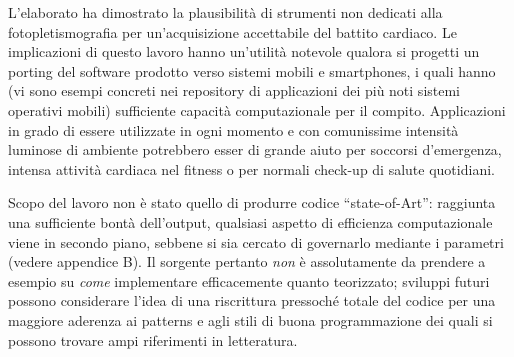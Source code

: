 L'elaborato ha dimostrato la plausibilità di strumenti non dedicati alla fotopletismografia per un'acquisizione accettabile del battito cardiaco. Le implicazioni di questo lavoro hanno un'utilità notevole qualora si progetti un porting del software prodotto verso sistemi mobili e smartphones, i quali hanno (vi sono esempi concreti nei repository di applicazioni dei più noti sistemi operativi mobili) sufficiente capacità computazionale per il compito.
 Applicazioni in grado di essere utilizzate in ogni momento e con comunissime intensità luminose di ambiente potrebbero esser di grande aiuto per soccorsi d'emergenza, intensa attività cardiaca nel fitness o per normali check-up di salute quotidiani.

Scopo del lavoro non è stato quello di produrre codice ``state-of-Art'': raggiunta una sufficiente bontà dell'output, qualsiasi aspetto di efficienza computazionale viene in secondo piano, sebbene si sia cercato di governarlo mediante i parametri (vedere appendice B). Il sorgente pertanto {\em non} è assolutamente da prendere a esempio su {\em come} implementare efficacemente quanto teorizzato; sviluppi futuri possono considerare l'idea di una riscrittura pressoché totale del codice per una maggiore aderenza ai patterns e agli stili di buona programmazione dei quali si possono trovare ampi riferimenti in letteratura.